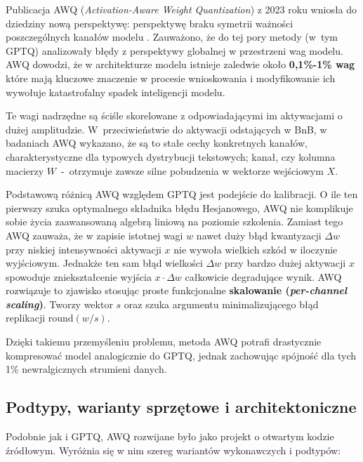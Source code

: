 Publicacja AWQ (\textit{Activation-Aware Weight Quantization}) z 2023 roku wniosła do dziedziny nową perspektywę: perspektywę braku symetrii ważności poszczególnych kanałów modelu \cite{lin2026awq}. Zauważono, że do tej pory metody (w~tym GPTQ) analizowały błędy z perspektywy globalnej w przestrzeni wag modelu. AWQ dowodzi, że w architekturze modelu istnieje zaledwie około \textbf{0,1\%-1\% wag} które mają kluczowe znaczenie w procesie wnioskowania i modyfikowanie ich wywołuje katastrofalny spadek inteligencji modelu.

Te wagi nadrzędne są ściśle skorelowane z odpowiadającymi im aktywacjami o dużej amplitudzie. W~przeciwieństwie do aktywacji odstających w BnB, w badaniach AWQ wykazano, że są to stałe cechy konkretnych kanałów, charakterystyczne dla typowych dystrybucji tekstowych; kanał, czy kolumna macierzy $W$~-~otrzymuje zawsze silne pobudzenia w wektorze wejściowym $X$.

Podstawową różnicą AWQ względem GPTQ jest podejście do kalibracji. O ile ten pierwszy szuka optymalnego składnika błędu Hesjanowego, AWQ nie komplikuje sobie życia zaawansowaną algebrą liniową na poziomie szkolenia. Zamiast tego AWQ zauważa, że w zapisie istotnej wagi $w$ nawet duży błąd kwantyzacji $\Delta w$ przy niskiej intensywności aktywacji $x$ nie wywoła wielkich szkód w iloczynie wyjściowym. Jednakże ten sam błąd wielkości $\Delta w$ przy bardzo dużej aktywacji $x$ spowoduje zniekształcenie wyjścia $x \cdot \Delta w$ całkowicie degradujące wynik. AWQ rozwiązuje to zjawisko stosując proste funkcjonalne \textbf{skalowanie (\textit{per-channel scaling})}. Tworzy wektor $s$ oraz szuka argumentu minimalizującego błąd replikacji $\mathrm{round}(w/s)$.

Dzięki takiemu przemyśleniu problemu, metoda AWQ potrafi drastycznie kompresować model analogicznie do GPTQ, jednak zachowując spójność dla tych 1\% newralgicznych strumieni danych.

\subsection{Podtypy, warianty sprzętowe i architektoniczne}

Podobnie jak i GPTQ, AWQ rozwijane było jako projekt o otwartym kodzie źródłowym. Wyróżnia się w nim szereg wariantów wykonawczych i podtypów:

